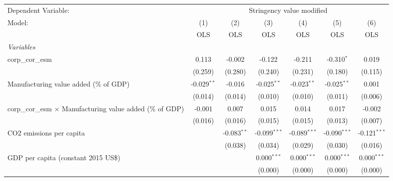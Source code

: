 
\begingroup
\centering
\begin{tabular}{lcccccc}
   \toprule
   Dependent Variable: & \multicolumn{6}{c}{Stringency value modified}\\
   Model:                                                            & (1)           & (2)           & (3)            & (4)            & (5)            & (6)\\  
                                                                     &  OLS          & OLS           & OLS            & OLS            & OLS            & OLS\\  
   \midrule
   \emph{Variables}\\
   corp\_cor\_esm                                                    & 0.113         & -0.002        & -0.122         & -0.211         & -0.310$^{*}$   & 0.019\\   
                                                                     & (0.259)       & (0.280)       & (0.240)        & (0.231)        & (0.180)        & (0.115)\\   
   Manufacturing value added (\% of GDP)                             & -0.029$^{**}$ & -0.016        & -0.025$^{**}$  & -0.023$^{**}$  & -0.025$^{**}$  & 0.001\\   
                                                                     & (0.014)       & (0.014)       & (0.010)        & (0.010)        & (0.011)        & (0.006)\\   
   corp\_cor\_esm $\times$ Manufacturing value added (\% of GDP)     & -0.001        & 0.007         & 0.015          & 0.014          & 0.017          & -0.002\\   
                                                                     & (0.016)       & (0.016)       & (0.015)        & (0.015)        & (0.013)        & (0.007)\\   
   CO2 emissions per capita                                          &               & -0.083$^{**}$ & -0.099$^{***}$ & -0.089$^{***}$ & -0.090$^{***}$ & -0.121$^{***}$\\   
                                                                     &               & (0.038)       & (0.034)        & (0.029)        & (0.030)        & (0.016)\\   
   GDP per capita (constant 2015 US\$)                               &               &               & 0.000$^{***}$  & 0.000$^{***}$  & 0.000$^{***}$  & 0.000$^{***}$\\   
                                                                     &               &               & (0.000)        & (0.000)        & (0.000)        & (0.000)\\   

\end{tabular}
